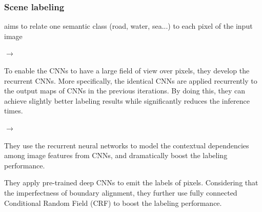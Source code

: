 \begin{frame}
	\frametitle{Scene labeling}
	
	
	 aims to relate one semantic class (road, water, sea...) to each pixel of the input image
	
	\bigskip
	
	$\rightarrow$  
	
	To enable the CNNs to have a large field of view over pixels, they  develop the recurrent CNNs. More specifically, the identical CNNs are applied recurrently to the output maps of CNNs in the previous iterations. By doing this, they can achieve slightly better labeling results while significantly reduces the inference times.
	
	\bigskip
	
	$\rightarrow$ 
	
	They use the recurrent neural networks to model the contextual dependencies among image features from CNNs, and dramatically boost the labeling performance.
	
	\bigskip
	
	
	
	
	
	They apply pre-trained deep CNNs to emit the labels of pixels. Considering that the imperfectness of boundary alignment, they further use fully connected Conditional Random Field (CRF) to boost the labeling performance.
	
	
	
	
\end{frame}

